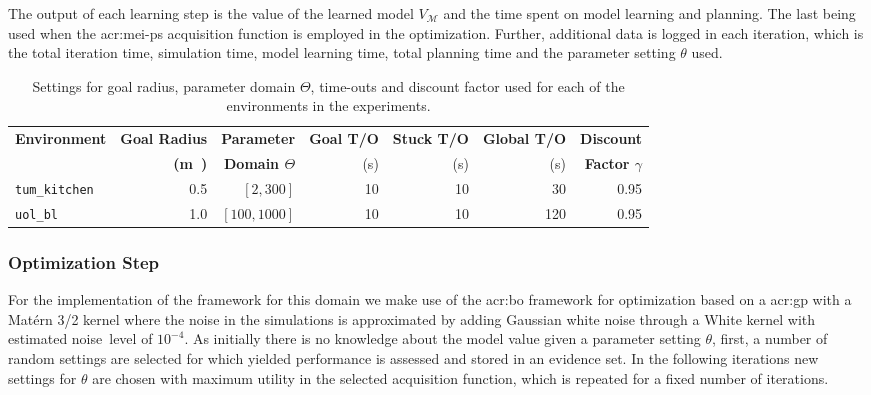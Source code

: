 The output of each learning step is the value of the learned model $V_\mathcal{M}$ and the time spent on model learning and planning.
The last being used when the \acrshort{acr:mei-ps} acquisition function is employed in the optimization.
Further, additional data is logged in each iteration, which is the total iteration time, simulation time, model learning time, total planning time and the parameter setting $\theta$ used.


\begin{table}
	\caption{Settings for goal radius, parameter domain $\Theta$, time-outs and discount factor used for each of the environments in the experiments.}
	\label{tab:designer-settings}\centering
	\begin{tabular}{|l|r|r|r|r|r|r|}
		\hline
		\textbf{Environment} & \textbf{Goal Radius} & \textbf{Parameter} & \textbf{Goal T/O} & \textbf{Stuck T/O} & \textbf{Global T/O} & \textbf{Discount}  \\
		
		& \textbf{(\si\meter)} & \textbf{Domain $\Theta$} & (\si{\second}) & (\si{\second}) & (\si{\second}) & \textbf{Factor $\gamma$}\\
		\hline
		\texttt{tum\_kitchen} & \num{0.5} & $[2, 300]$ & \num{10} & \num{10} & \num{30} & \num{0.95} \\
		\hline
		\texttt{uol\_bl} & \num{1.0} & $[100, 1000]$ & \num{10} & \num{10} & \num{120} & \num{0.95}\\
		\hline
	\end{tabular}
\end{table}

\subsubsection{Optimization Step}

For the implementation of the framework for this domain we make use of the \acrshort{acr:bo} framework for optimization based on a \acrshort{acr:gp} with a Mat\'ern 3/2 kernel where the noise in the simulations is approximated by adding Gaussian white noise through a White kernel with estimated noise~level of $10^{-4}$.
As initially there is no knowledge about the model value given a parameter setting $\theta$, first, a number of random settings are selected for which yielded performance is assessed and stored in an evidence set.
In the following iterations new settings for $\theta$ are chosen with maximum utility in the selected acquisition function, which is repeated for a fixed number of iterations.

